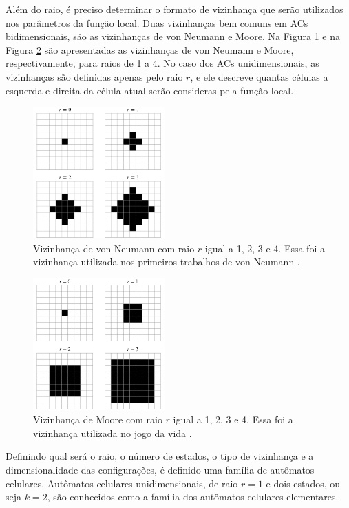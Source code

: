 \documentclass[12pt,a4paper]{article}
\begin{document}
Além do raio, é preciso determinar o formato de vizinhança que serão utilizados nos parâmetros da função local. Duas vizinhanças bem comuns em ACs bidimensionais, são as vizinhanças de von Neumann e Moore. Na Figura \ref{fig:vVonNeumann} e na Figura \ref{fig:vMoore} são apresentadas as vizinhanças de von Neumann e Moore, respectivamente, para raios de 1 a 4. No caso dos ACs unidimensionais, as vizinhanças são definidas apenas pelo raio $r$, e ele descreve quantas células a esquerda e direita da célula atual serão consideras pela função local.
	\begin{figure}[h!]
	  \centering
	  \includegraphics[width=0.45\textwidth]{fig_vVonNeumann.png}
	  \caption{Vizinhança de von Neumann com raio $r$ igual a 1, 2, 3 e 4. Essa foi a vizinhança utilizada nos primeiros trabalhos de von Neumann \cite{weisstein2015b}.}
	  \label{fig:vVonNeumann}
	\end{figure}

	\begin{figure}[h!]
	  \centering
	  \includegraphics[width=0.45\textwidth]{fig_vMoore.png}
	  \caption{Vizinhança de Moore com raio $r$ igual a 1, 2, 3 e 4. Essa foi a vizinhança utilizada no jogo da vida \cite{weisstein2015c}.}
	  \label{fig:vMoore}
	\end{figure}

Definindo qual será o raio, o número de estados, o tipo de vizinhança e a dimensionalidade das configurações, é definido uma família de autômatos celulares. Autômatos celulares unidimensionais, de raio $r=1$ e dois estados, ou seja $k=2$, são conhecidos como a família dos autômatos celulares elementares.
\end{document}
